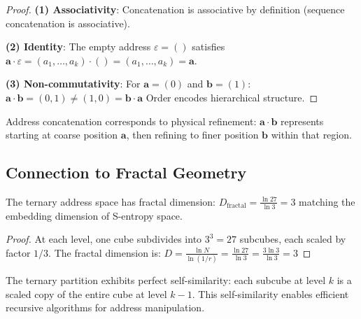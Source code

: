 \begin{proof}
\textbf{(1) Associativity}: Concatenation is associative by definition (sequence concatenation is associative).

\textbf{(2) Identity}: The empty address $\varepsilon = ()$ satisfies $\mathbf{a} \cdot \varepsilon = (a_1, \ldots, a_k) \cdot () = (a_1, \ldots, a_k) = \mathbf{a}$.

\textbf{(3) Non-commutativity}: For $\mathbf{a} = (0)$ and $\mathbf{b} = (1)$:
$
\mathbf{a} \cdot \mathbf{b} = (0, 1) \neq (1, 0) = \mathbf{b} \cdot \mathbf{a}
$
Order encodes hierarchical structure.
\end{proof}

\begin{corollary}
\label{cor:refinement}
Address concatenation corresponds to physical refinement: $\mathbf{a} \cdot \mathbf{b}$ represents starting at coarse position $\mathbf{a}$, then refining to finer position $\mathbf{b}$ within that region.
\end{corollary}

\subsection{Connection to Fractal Geometry}

\begin{proposition}
\label{prop:fractal}
The ternary address space has fractal dimension:
$
D_{\mathrm{fractal}} = \frac{\ln 27}{\ln 3} = 3
$
matching the embedding dimension of S-entropy space.
\end{proposition}

\begin{proof}
At each level, one cube subdivides into $3^3 = 27$ subcubes, each scaled by factor $1/3$. The fractal dimension is:
$
D = \frac{\ln N}{\ln(1/r)} = \frac{\ln 27}{\ln 3} = \frac{3\ln 3}{\ln 3} = 3
$
\end{proof}

\begin{remark}
The ternary partition exhibits perfect self-similarity: each subcube at level $k$ is a scaled copy of the entire cube at level $k-1$. This self-similarity enables efficient recursive algorithms for address manipulation.
\end{remark}


